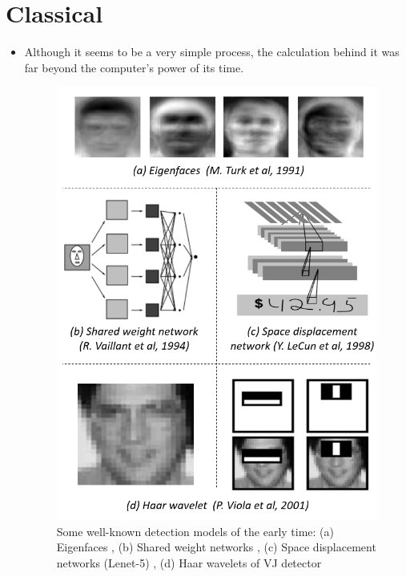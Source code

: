 \documentclass{beamer}
\begin{document}
\section{Classical}
\begin{frame}
    \begin{itemize}[<+-| alert@+>]
        \item Although it seems to be a very simple process, the calculation behind it was far beyond the computer's power of its time. \begin{figure}[h!]
            \begin{center}
                \includegraphics[width=0.4\linewidth]{earlytime.png}
                \caption{\small Some well-known detection models of the early time: (a) Eigenfaces , (b) Shared weight networks , (c) Space displacement networks (Lenet-5) , (d) Haar wavelets of VJ detector}
            \end{center}
        \end{figure}
 
    \end{itemize}

\end{frame}
%        
\end{document}
